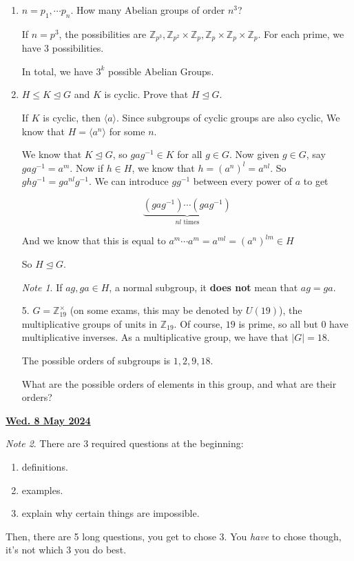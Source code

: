 \documentclass[12pt]{article}
\renewcommand{\date}[1]{\underline{\bf #1}}
\def\Z{{\mathbb Z}}
\newcommand{\lr}[1]{\langle #1 \rangle}
\theoremstyle{remark}
\theoremstyle{remark}
\theoremstyle{remark}
\theoremstyle{remark}
\theoremstyle{remark}
\newtheorem*{note}{Note}
\begin{document}
\begin{enumerate}
  \item $n = p_1, \cdots p_n$. How many Abelian groups of order $n^3$?

    If $n = p^3$, the possibilities are $\Z_{p^3}, \Z_{p^2} \times \Z_p, \Z_p
    \times \Z_p \times \Z_p$. For each prime, we have $3$ possibilities.

    In total, we have $3^k$ possible Abelian Groups.

  \item $H \le K \trianglelefteq G$ and $K$ is cyclic. Prove that $H
    \trianglelefteq G$.

    If $K$ is cyclic, then $\lr{a}$. Since subgroups of cyclic groups are also
    cyclic, We know that $H = \lr{a^n}$ for some $n$.

    We know that $K \trianglelefteq G$, so $gag^{-1} \in K$ for all $g \in G$.
    Now given $g \in G$, say $gag^{-1} = a^m$. Now if $h \in H$, we know that $h
    = (a^n)^l = a^{nl}$. So $ghg^{-1} = ga^{nl}g^{-1}$. We can introduce
    $gg^{-1}$ between every power of $a$ to get

    \[
      \underbrace{(gag^{-1}) \cdots (gag^{-1})}_{\text{$nl$ times}}
    \]

    And we know that this is equal to $a^m \cdots a^m = a^{ml} = (a^n)^{lm} \in
    H$

    So $H \trianglelefteq G$.

    \begin{note}
      If $ag, ga \in H$, a normal subgroup, it {\bf does not} mean that $ag =
      ga$.
    \end{note}

  \item[5.] $G = \Z^{\times}_{19}$ (on some exams, this may be denoted by
    $U(19)$), the multiplicative groups of units in $\Z_{19}$. Of course, $19$
    is prime, so all but $0$ have multiplicative inverses. As a multiplicative
    group, we have that $|G| = 18$.

    The possible orders of subgroups is $1, 2, 9, 18$.

    What are the possible orders of elements in this group, and what are their
    orders?
\end{enumerate}

\date{Wed. 8 May 2024}

\begin{note}
  There are 3 required questions at the beginning: 
  \begin{enumerate}
    \item definitions.
    \item examples.
    \item explain why certain things are impossible.
  \end{enumerate}
  
  Then, there are 5 long questions, you get to chose 3. You {\it have} to chose
  though, it's not which 3 you do best.
\end{note}
\end{document}
